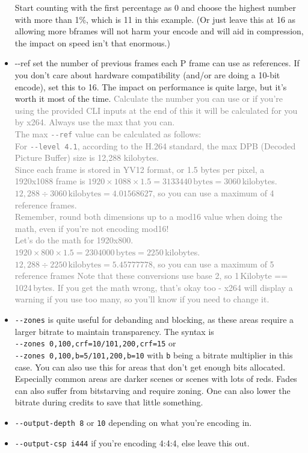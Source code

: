 \documentclass{scrartcl}
\begin{document}
\begin{itemize}
Start counting with the first percentage as 0 and choose the highest number with more than 1\%, which is 11 in this example. (Or just leave this at 16 as allowing more bframes will not harm your encode and will aid in compression, the impact on speed isn't that enormous.)
\item -{}-ref set the number of previous frames each P frame can use as references.  If you don't care about hardware compatibility (and/or are doing a 10-bit encode), set this to 16.  The impact on performance is quite large, but it's worth it most of the time.  \textcolor{gray}{Calculate the number you can use or if you're using the provided CLI inputs at the end of this it will be calculated for you by x264. Always use the max that you can.\\
The max \texttt{-{}-ref} value can be calculated as follows:\\
For \texttt{-{}-level 4.1}, according to the H.264 standard, the max DPB (Decoded Picture Buffer) size is 12,288 kilobytes.\\
Since each frame is stored in YV12 format, or 1.5 bytes per pixel, a 1920x1088 frame is $1920 \times 1088 \times 1.5 = 3133440\,\mathrm{bytes} = 3060$\,kilobytes.\\
$12,288 \div 3060\,\mathrm{kilobytes} = 4.01568627$, so you can use a maximum of 4 reference frames.\\
Remember, round both dimensions up to a mod16 value when doing the math, even if you're not encoding mod16!\\
Let's do the math for 1920x800.\\
$1920 \times 800 \times 1.5 = 2304000\,\mathrm{bytes} = 2250$\,kilobytes. $12,288 \div 2250\,\mathrm{kilobytes} = 5.45777778$, so you can use a maximum of 5 reference frames Note that these conversions use base 2, so 1\,Kilobyte == 1024\,bytes. If you get the math wrong, that's okay too - x264 will display a warning if you use too many, so you'll know if you need to change it.}

\item \texttt{-{}-zones} is quite useful for debanding and blocking, as these areas require a larger bitrate to maintain transparency.  The syntax is \\\texttt{-{}-zones 0,100,crf=10/101,200,crf=15} or\\ \texttt{-{}-zones 0,100,b=5/101,200,b=10} with \texttt{b} being a bitrate multiplier in this case.  You can also use this for areas that don't get enough bits allocated.  Especially common areas are darker scenes or scenes with lots of reds.  Fades can also suffer from bitstarving and require zoning.  One can also lower the bitrate during credits to save that little something.
\item \texttt{-{}-output-depth 8} or \texttt{10} depending on what you're encoding in.
\item \texttt{-{}-output-csp i444} if you're encoding 4:4:4, else leave this out.
\end{itemize}
\end{document}
